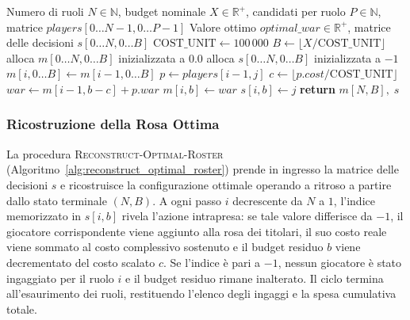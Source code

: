 \begin{algorithm}[!htbp]
	\small
	\caption{Calcolo del WAR Ottimale e della Tabella delle Scelte}
	\label{alg:compute_optimal_war}
	\begin{algorithmic}[1]
		\Require Numero di ruoli $N \in \mathbb{N}$, budget nominale $X \in \mathbb{R}^+$, candidati per ruolo $P \in \mathbb{N}$, matrice $\mathit{players}[0 \dots N-1, 0 \dots P-1]$
		\Ensure Valore ottimo $\mathit{optimal\_war} \in \mathbb{R}^+$, matrice delle decisioni $s[0 \dots N, 0 \dots B]$
		\State $\text{COST\_UNIT} \gets 100\,000$
		\State $B \gets \lfloor X / \text{COST\_UNIT} \rfloor$
		\State alloca $m[0 \dots N, 0 \dots B]$ inizializzata a $0.0$
		\State alloca $s[0 \dots N, 0 \dots B]$ inizializzata a $-1$
		 
		\State $m[i, 0 \dots B] \gets m[i - 1, 0 \dots B]$ 
		 
		\State $p \gets \mathit{players}[i - 1, j]$
		\State $c \gets \lfloor p.\mathit{cost} / \text{COST\_UNIT} \rfloor$
		 
		\State $\mathit{war} \gets m[i - 1, b - c] + p.\mathit{war}$
		\State $m[i, b] \gets \mathit{war}$
		\State $s[i, b] \gets j$ 
		\EndIf
		\EndFor
		\EndFor
		\EndFor
		\State \textbf{return} $m[N, B], \; s$
		\EndProcedure
	\end{algorithmic}
\end{algorithm}

\subsubsection{Ricostruzione della Rosa Ottima}
La procedura \textsc{Reconstruct-Optimal-Roster} (Algoritmo~\ref{alg:reconstruct_optimal_roster}) prende in ingresso la matrice delle decisioni $s$ e ricostruisce la configurazione ottimale operando a ritroso a partire dallo stato terminale $(N, B)$. A ogni passo $i$ decrescente da $N$ a $1$, l'indice memorizzato in $s[i, b]$ rivela l'azione intrapresa: se tale valore differisce da $-1$, il giocatore corrispondente viene aggiunto alla rosa dei titolari, il suo costo reale viene sommato al costo complessivo sostenuto e il budget residuo $b$ viene decrementato del costo scalato $c$. Se l'indice è pari a $-1$, nessun giocatore è stato ingaggiato per il ruolo $i$ e il budget residuo rimane inalterato. Il ciclo termina all'esaurimento dei ruoli, restituendo l'elenco degli ingaggi e la spesa cumulativa totale.

